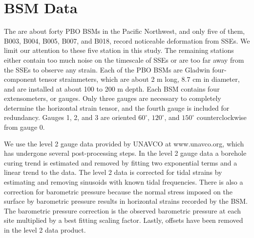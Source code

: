 \section{BSM Data}
The are about forty PBO BSMs in the Pacific Northwest, and only five
of them, B003, B004, B005, B007, and B018, record noticeable
deformation from SSEs. We limit our attention to these five station in
this study.  The remaining stations either contain too much noise on
the timescale of SSEs or are too far away from the SSEs to observe any
strain. Each of the PBO BSMs are Gladwin four-component tensor
strainmeters, which are about 2 m long, 8.7 cm in diameter, and are
installed at about 100 to 200 m depth. Each BSM contains four
extensometers, or gauges. Only three gauges are necessary to
completely determine the horizontal strain tensor, and the fourth
gauge is included for redundancy. Gauges 1, 2, and 3 are oriented
$60^\circ$, $120^\circ$, and $150^\circ$ counterclockwise from gauge
0.

We use the level 2 gauge data provided by UNAVCO at www.unavco.org,
which has undergone several post-processing steps. In the level 2
gauge data a borehole curing trend is estimated and removed by fitting
two exponential terms and a linear trend to the data. The level 2 data
is corrected for tidal strains by estimating and removing sinusoids
with known tidal frequencies. There is also a correction for
barometric pressure because the normal stress imposed on the surface
by barometric pressure results in horizontal strains recorded by the
BSM. The barometric pressure correction is the observed barometric
pressure at each site multiplied by a best fitting scaling factor.
Lastly, offsets have been removed in the level 2 data product.

